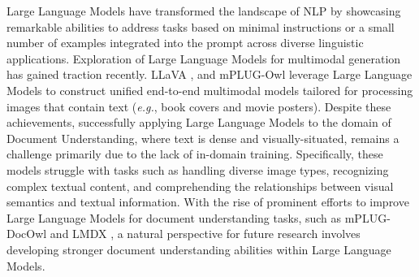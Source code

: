 Large Language Models have transformed the landscape of \ac{NLP} by showcasing remarkable abilities to address tasks based on minimal instructions \citep{wei2021finetuned} or a small number of examples integrated into the prompt \citep{brown2020language} across diverse linguistic applications. Exploration of Large Language Models for multimodal generation has gained traction recently. LLaVA \citep{liu2023visual}, and mPLUG-Owl \citep{ye2023mplug} leverage Large Language Models to construct unified end-to-end multimodal models tailored for processing images that contain text (\textit{e.g.}, book covers and movie posters). Despite these achievements, successfully applying Large Language Models to the domain of Document Understanding, where text is dense and visually-situated, remains a challenge primarily due to the lack of in-domain training. Specifically, these models struggle with tasks such as handling diverse image types, recognizing complex textual content, and comprehending the relationships between visual semantics and textual information. With the rise of prominent efforts to improve Large Language Models for document understanding tasks, such as mPLUG-DocOwl \citep{ye2023mplug} and LMDX \citep{perot2023lmdx}, a natural perspective for future research involves developing stronger document understanding abilities within Large Language Models.


